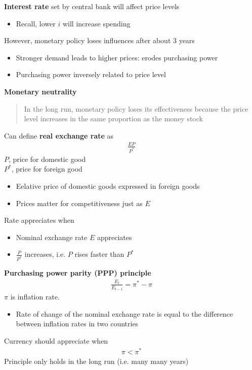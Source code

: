 \documentclass{beamer}
\begin{document}
\begin{frame}
  \textbf{Interest rate} set by central bank will affect price levels
  \begin{itemize}
    \item Recall, lower $i$ will increase spending
  \end{itemize}
  \medskip
  However, monetary policy loses influences after about 3 years
  \begin{itemize}
    \item Stronger demand leads to higher prices: erodes purchasing power
    \item Purchasing power inversely related to price level
  \end{itemize}
  \medskip
  \textbf{Monetary neutrality}
  \begin{quote}
      In the long run, monetary policy loses its effectiveness because the price level increases in the same proportion as the money stock
  \end{quote}  
\end{frame}

\begin{frame} 
  Can define  \textbf{real exchange rate} as 
  \begin{align}
    \frac{EP}{P^*}
  \end{align}
  $P$, price for domestic good\\
  $P^*$, price for foreign good
  \begin{itemize}
    \item Eelative price of domestic goods expressed in foreign goods
    \item Prices matter for competitiveness just as $E$
  \end{itemize}
  \medskip
  Rate appreciates when
  \begin{itemize}
    \item Nominal exchange rate $E$ appreciates
    \item $\frac{P}{P^*}$ increases, i.e. $P$ rises faster than $P^*$
  \end{itemize}
\end{frame}

\begin{frame}
  \textbf{Purchasing power parity (PPP) principle}
  \begin{align}
    \frac{E_t}{E_{t-1}} = \pi^* - \pi
  \end{align}
  $\pi$ is inflation rate.
  \begin{itemize}
    \item Rate of change of the nominal exchange rate is equal to the difference between inflation rates in two countries    
  \end{itemize}
  \medskip
  Currency should appreciate when
  \begin{align}
    \pi<\pi^*
  \end{align}
  \medskip
  Principle only holds in the long run (i.e. many many years)
\end{frame}
\end{document}

